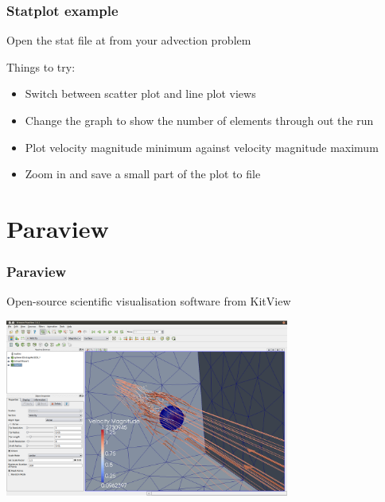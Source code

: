\documentclass[12pt]{beamer}
\begin{document}
\begin{frame}
    \frametitle{Statplot example}
Open the stat file at from your advection problem

Things to try:
\begin{itemize}
\item Switch between scatter plot and line plot views
\item Change the graph to show the number of elements through out the run
\item Plot velocity magnitude minimum against velocity magnitude maximum
\item Zoom in and save a small part of the plot to file
\end{itemize}
\end{frame}


\section{Paraview}
\begin{frame}
    \frametitle{Paraview}
Open-source scientific visualisation software from KitView
\begin{center}
\includegraphics[width=0.7\textwidth]{images/paraview_example.png}
\end{center}
\end{frame}
\end{document}
